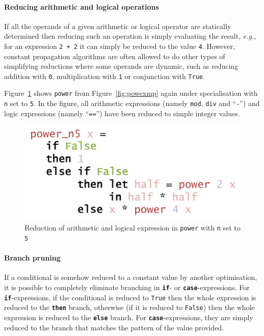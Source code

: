 \documentclass{ituthesis}
\newcommand{\ttconstructor}[1]{\textcolor{constructor-color}{\texttt{#1}}}
\newcommand{\ttdec}[1]{\textcolor{declared-var-color}{\texttt{#1}}}
\newcommand{\ttvar}[1]{\textcolor{local-var-color}{\texttt{#1}}}
\newcommand{\ttliteral}[1]{\textcolor{literal-color}{\texttt{#1}}}
\theoremstyle{break}
\begin{document}
\paragraph{Reducing arithmetic and logical operations}
\label{par:Reducingarithmeticandlogicaloperations}
If all the operands of a given arithmetic or logical operator are statically determined then reducing such an operation is simply evaluating the result, \textit{e.g.}, for an expression \ttliteral{2}~\texttt{+}~\ttliteral{2} it can simply be reduced to the value \ttliteral{4}.
However, constant propagation algorithms are often allowed to do other types of simplifying reductions where some operands are dynamic, such as reducing addition with \ttliteral{0}, multiplication with \ttliteral{1} or conjunction with \ttconstructor{True}.

Figure~\ref{fig:powxcf} shows \ttdec{power} from Figure~\ref{fig:powexmp} again under specialisation with \ttvar{n} set to \ttliteral{5}. In the figure, all arithmetic expressions (namely \ttdec{mod}, \ttdec{div} and ``\texttt{-}'') and logic expressions (namely ``\texttt{==}'') have been reduced to simple integer values.

\begin{figure}[ht]
\begin{center}
    \includegraphics[scale=0.5]{Figures/PowerExampleConstantFolding.png}
\end{center}
\caption{Reduction of arithmetic and logical expression in \ttdec{power} with \ttvar{n} set to \ttliteral{5}}
\label{fig:powxcf}
\end{figure}


\paragraph{Branch pruning}
\label{par:Branch pruning}
If a conditional is somehow reduced to a constant value by another optimisation, it is possible to completely eliminate branching in \texttt{\textbf{if}}- or \texttt{\textbf{case}}-expressions.
For \texttt{\textbf{if}}-expressions, if the conditional is reduced to \ttconstructor{True} then the whole expression is reduced to the \texttt{\textbf{then}} branch, otherwise (if it is reduced to \ttconstructor{False}) then the whole expression is reduced to the \texttt{\textbf{else}} branch.
For \texttt{\textbf{case}}-expressions, they are simply reduced to the branch that matches the pattern of the value provided.
\end{document}
